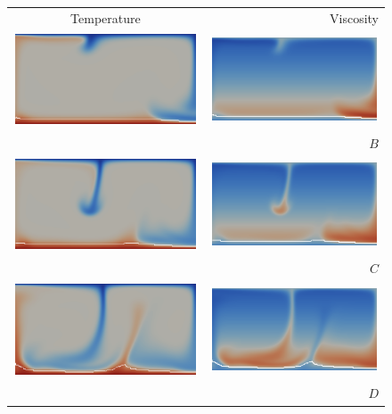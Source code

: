 \begin{figure}
\begin{center}
\begin{tabular}{c  r}
Temperature & Viscosity \\
\includegraphics[width=0.45\columnwidth]{chapters/vynnytska/png/tmB.png} &
\includegraphics[width=0.45\columnwidth]{chapters/vynnytska/png/visB.png} \\& $B$ \\
\includegraphics[width=0.45\columnwidth]{chapters/vynnytska/png/tmC.png} &
\includegraphics[width=0.45\columnwidth]{chapters/vynnytska/png/visC.png} \\& $C$ \\
\includegraphics[width=0.45\columnwidth]{chapters/vynnytska/png/tmD.png} &
\includegraphics[width=0.45\columnwidth]{chapters/vynnytska/png/visD.png} \\& $D$ \\

\end{tabular}
\end{center}
\end{figure}
